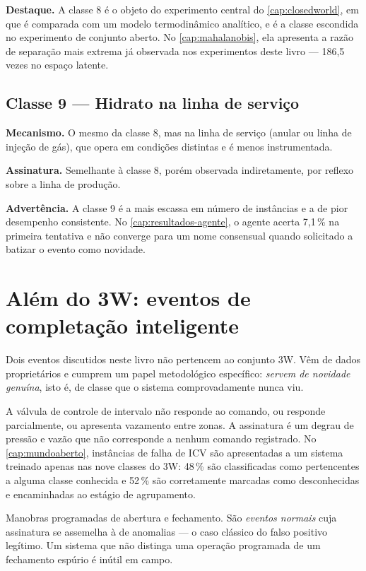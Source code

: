 \textbf{Destaque.} A classe 8 é o objeto do experimento central do
\cref{cap:closedworld}, em que é comparada com um modelo termodinâmico analítico, e é
a classe escondida no experimento de conjunto aberto. No \cref{cap:mahalanobis}, ela
apresenta a razão de separação mais extrema já observada nos experimentos deste livro
--- 186,5 vezes no espaço latente.

\subsection{Classe 9 --- Hidrato na linha de serviço}

\textbf{Mecanismo.} O mesmo da classe 8, mas na linha de serviço (anular ou linha de
injeção de gás), que opera em condições distintas e é menos instrumentada.

\textbf{Assinatura.} Semelhante à classe 8, porém observada indiretamente, por reflexo
sobre a linha de produção.

\textbf{Advertência.} A classe 9 é a mais escassa em número de instâncias e a de pior
desempenho consistente. No \cref{cap:resultados-agente}, o agente acerta 7,1\,\% na
primeira tentativa e não converge para um nome consensual quando solicitado a batizar
o evento como novidade.

\section{Além do 3W: eventos de completação inteligente}
\label{sec:dominio-icv}

Dois eventos discutidos neste livro não pertencem ao conjunto 3W. Vêm de dados
proprietários e cumprem um papel metodológico específico: \emph{servem de novidade
genuína}, isto é, de classe que o sistema comprovadamente nunca viu.

\begin{description}[leftmargin=0pt,style=nextline,itemsep=0.5em]

\item[Falha de ICV.] A válvula de controle de intervalo não responde ao comando, ou
responde parcialmente, ou apresenta vazamento entre zonas. A assinatura é um degrau de
pressão e vazão que não corresponde a nenhum comando registrado. No
\cref{cap:mundoaberto}, instâncias de falha de ICV são apresentadas a um sistema
treinado apenas nas nove classes do 3W: 48\,\% são classificadas como pertencentes a
alguma classe conhecida e 52\,\% são corretamente marcadas como desconhecidas e
encaminhadas ao estágio de agrupamento.

\item[Operação de válvula.] Manobras programadas de abertura e fechamento. São
\emph{eventos normais} cuja assinatura se assemelha à de anomalias --- o caso clássico
do falso positivo legítimo. Um sistema que não distinga uma operação programada de um
fechamento espúrio é inútil em campo.

\end{description}

